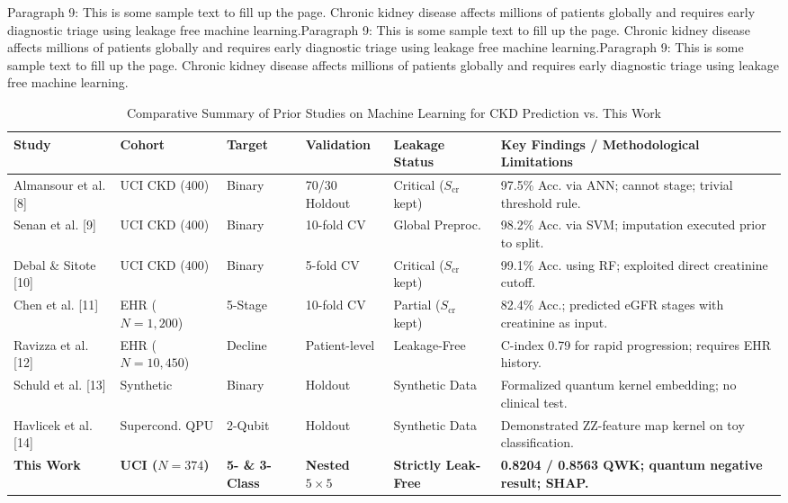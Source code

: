 \documentclass{IEEEtran}
\begin{document}
Paragraph 9: This is some sample text to fill up the page. Chronic kidney disease affects millions of patients globally and requires early diagnostic triage using leakage free machine learning.Paragraph 9: This is some sample text to fill up the page. Chronic kidney disease affects millions of patients globally and requires early diagnostic triage using leakage free machine learning.Paragraph 9: This is some sample text to fill up the page. Chronic kidney disease affects millions of patients globally and requires early diagnostic triage using leakage free machine learning.

\begin{table}[t]
\centering
\caption{Comparative Summary of Prior Studies on Machine Learning for CKD Prediction vs. This Work}
\label{tab:lit_comparison}
\renewcommand{\arraystretch}{1.02}
\footnotesize
\begin{tabularx}{\textwidth}{p{2.8cm}p{2.2cm}p{1.8cm}p{2.0cm}p{2.2cm}X}
\toprule
\textbf{Study} & \textbf{Cohort} & \textbf{Target} & \textbf{Validation} & \textbf{Leakage Status} & \textbf{Key Findings / Methodological Limitations} \\
\midrule
Almansour et al. [8] & UCI CKD (400) & Binary & 70/30 Holdout & Critical ($S_{\text{cr}}$ kept) & 97.5\% Acc. via ANN; cannot stage; trivial threshold rule. \\
Senan et al. [9] & UCI CKD (400) & Binary & 10-fold CV & Global Preproc. & 98.2\% Acc. via SVM; imputation executed prior to split. \\
Debal \& Sitote [10] & UCI CKD (400) & Binary & 5-fold CV & Critical ($S_{\text{cr}}$ kept) & 99.1\% Acc. using RF; exploited direct creatinine cutoff. \\
Chen et al. [11] & EHR ($N = 1,200$) & 5-Stage & 10-fold CV & Partial ($S_{\text{cr}}$ kept) & 82.4\% Acc.; predicted eGFR stages with creatinine as input. \\
Ravizza et al. [12] & EHR ($N = 10,450$) & Decline & Patient-level & Leakage-Free & C-index 0.79 for rapid progression; requires EHR history. \\
Schuld et al. [13] & Synthetic & Binary & Holdout & Synthetic Data & Formalized quantum kernel embedding; no clinical test. \\
Havlicek et al. [14] & Supercond. QPU & 2-Qubit & Holdout & Synthetic Data & Demonstrated ZZ-feature map kernel on toy classification. \\
\textbf{This Work} & \textbf{UCI ($N = 374$)} & \textbf{5- \& 3-Class} & \textbf{Nested $5 \times 5$} & \textbf{Strictly Leak-Free} & \textbf{0.8204 / 0.8563 QWK; quantum negative result; SHAP.} \\
\bottomrule
\end{tabularx}
\end{table}
\end{document}
